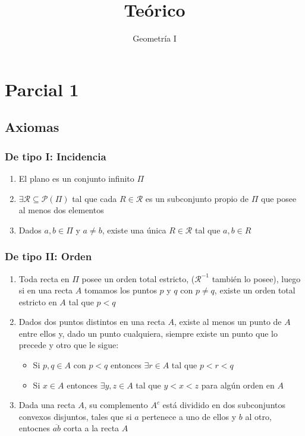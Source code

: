 \documentclass[a4paper]{article}
\title{Teórico}
\author{Geometría I}
\begin{document}
\maketitle
\section{Parcial 1}
\subsection{Axiomas}
\subsubsection{De tipo I: Incidencia}
\begin{enumerate}
    \item El plano es un conjunto infinito $\Pi$
    \item $\exists \mathcal{R} \subseteq \mathcal{P}(\Pi)$ tal que cada $R \in \mathcal{R}$ es un subconjunto propio de $\Pi$ que posee al menos dos elementos
    \item Dados $a,b \in \Pi$ y $a \neq b$, existe una única $R \in \mathcal{R}$ tal que $a,b \in R$ 
\end{enumerate}
\subsubsection{De tipo II: Orden}
\begin{enumerate}
    \item Toda recta en $\Pi$ posee un orden total estricto, ($\mathcal{R^{-1}}$ también lo posee), luego si en una recta $A$ tomamos los puntos $p$ y $q$ con $p \neq q$, existe un orden total estricto en $A$ tal que $p<q$
    \item Dados dos puntos distintos en una recta $A$, existe al menos un punto de $A$ entre ellos y, dado un punto cualquiera, siempre existe un punto que lo precede y otro que le sigue:
    \begin{itemize}
        \item Si $p,q \in A$ con $p<q$ entonces $\exists r \in A$ tal que $p<r<q$
        \item Si $x \in A$ entonces $\exists y,z \in A$ tal que $y<x<z$ para algún orden en $A$
    \end{itemize}
    \item Dada una recta $A$, su complemento $A^c$ está dividido en dos subconjuntos convexos disjuntos, tales que si $a$ pertenece a uno de ellos y $b$ al otro, entocnes $\overline{ab}$ corta a la recta $A$
\end{enumerate}
\end{document}
